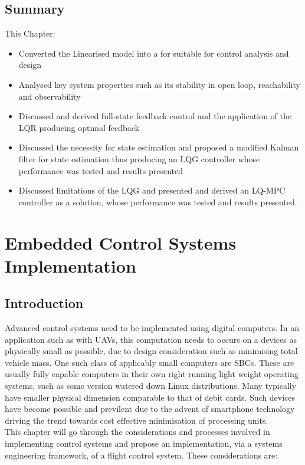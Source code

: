 \documentclass[12pt,a4paper,twoside]{report}
\begin{document}
			\newpage
			
		\section{Summary}
			
			This Chapter:
			\begin{itemize}
				\item 
					Converted the Linearised model into a for suitable for control analysis and design
				\item 
					Analysed key system properties such as its stability in open loop, reachability and observability 
				\item
					Discussed and derived full-state feedback control and the application of the LQR producing optimal feedback
				\item
					Discussed the necessity for state estimation and proposed a modified Kalman filter for state estimation thus producing an LQG controller whose performance was tested and results presented
				\item
					Discussed limitations of the LQG and presented and derived an LQ-MPC controller as a solution, whose performance was tested and results presented.
			\end{itemize}
		
	\newpage
		
	\chapter{Embedded Control Systems Implementation}
		
		\section{Introduction}
			
			Advanced control systems need to be implemented using digital computers. In an application such as with UAVs, this computation needs to occurs on a devices as physically small as possible, due to design consideration such as minimising total vehicle mass. One such class of applicably small computers are SBCs. These are usually fully capable computers in their own right running light weight operating systems, such as some version watered down Linux distributions. Many typically have smaller physical dimension comparable to that of debit cards. Such devices have become possible and previlent due to the advent of smartphone technology driving the trend towards cost effective minimisation of processing units. 
			\\
		 	This chapter will go through the considerations and processes involved in implementing control systems and propose an implementation, via a systems engineering framework, of a flight control system. These considerations are:
			
\end{document}
